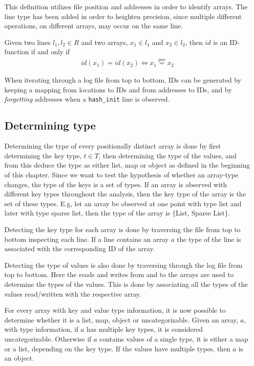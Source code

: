This definition utilizes file position and addresses in order to identify arrays. The line type has been added in order to heighten precision, since multiple different operations, on different arrays, may occur on the same line. 

\begin{definition}
Given two lines $l_1, l_2\in R$ and two arrays, $x_1\in l_1$ and $x_2 \in l_2$, then $id$ is an ID-function if and only if
\begin{align*}
    id(x_1) = id(x_2) \Leftrightarrow x_1 \stackrel{pos}{=} x_2
\end{align*}
\end{definition}

When iterating through a log file from top to bottom, IDs can be generated by keeping a mapping from locations to IDs and from addresses to IDs, and by \emph{forgetting} addresses when a \texttt{hash\_init} line is observed.

\subsection{Determining type}
Determining the type of every positionally distinct array is done by first determining the key type, $t\in T$, then determining the type of the values, and from this deduce the type as either list, map or object as defined in the beginning of this chapter. Since we want to test the hypothesis of whether an array-type changes, the type of the keys is a set of types. If an array is observed with different key types throughout the analysis, then the key type of the array is the set of these types. E.g, let an array be observed at one point with type list and later with type sparse list, then the type of the array is $\{$List, Sparse List$\}$.

Detecting the key type for each array is done by traversing the file from top to bottom inspecting each line. If a line contains an array $a$ the type of the line is associated with the corresponding ID of the array.

Detecting the type of values is also done by traversing through the log file from top to bottom. Here the reads and writes from and to the arrays are used to determine the types of the values. This is done by associating all the types of the values read/written with the respective array. 

For every array with key and value type information, it is now possible to determine whether it is a list, map, object or uncategorizable. Given an array, $a$, with type information, if $a$ has multiple key types, it is considered uncategorizable. Otherwise if $a$ contains values of a single type, it is either a map or a list, depending on the key type. If the values have multiple types, then $a$ is an object.

